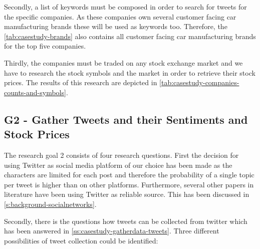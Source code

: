 Secondly, a list of keywords must be composed in order to search for tweets for the specific companies.
As these companies own several customer facing car manufacturing brands these will be used as keywords too.
Therefore, the \cref{tab:casestudy-brands} also contains all customer facing car manufacturing brands for the top five companies.

Thirdly, the companies must be traded on any stock exchange market and we have to research the stock symbols and the market in order to retrieve their stock prices.
The results of this research are depicted in \cref{tab:casestudy-companies-counts-and-symbols}.

\subsection{G2 - Gather Tweets and their Sentiments and Stock Prices}
\label{ss:conclusion-summary-g2}


The research goal 2 consists of four research questions.
First the decision for using Twitter as social media platform of our choice has been made as the characters are limited for each post and therefore the probability of a single topic per tweet is higher than on other platforms.
Furthermore, several other papers in literature have been using Twitter as reliable source.
This has been discussed in \cref{s:background-socialnetworks}.

Secondly, there is the questions how tweets can be collected from twitter which has been answered in \cref{ss:casestudy-gatherdata-tweets}.
Three different possibilities of tweet collection could be identified:

